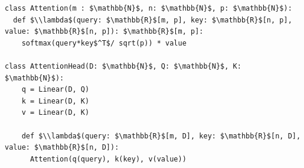 \documentclass[border=10pt]{standalone}
\begin{document}
\begin{lstlisting}
class Attention(m : $\mathbb{N}$, n: $\mathbb{N}$, p: $\mathbb{N}$):
  def $\\lambda$(query: $\mathbb{R}$[m, p], key: $\mathbb{R}$[n, p], value: $\mathbb{R}$[n, p]): $\mathbb{R}$[m, p]:
    softmax(query*key$^T$/ sqrt(p)) * value

class AttentionHead(D: $\mathbb{N}$, Q: $\mathbb{N}$, K: $\mathbb{N}$):
    q = Linear(D, Q)
    k = Linear(D, K)
    v = Linear(D, K)

    def $\\lambda$(query: $\mathbb{R}$[m, D], key: $\mathbb{R}$[n, D], value: $\mathbb{R}$[n, D]):
      Attention(q(query), k(key), v(value))
\end{lstlisting}
\end{document}
